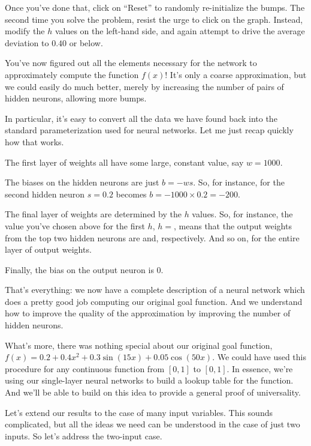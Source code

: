 Once you've done that, click on ``Reset'' to randomly re-initialize the bumps. The second time you solve the problem, resist the urge to click on the graph. Instead, modify the $h$ values on the left-hand side, and again attempt to drive the average deviation to $0.40$ or below.


You've now figured out all the elements necessary for the network to approximately compute the function $f(x)$! It's only a coarse approximation, but we could easily do much better, merely by increasing the number of pairs of hidden neurons, allowing more bumps.


In particular, it's easy to convert all the data we have found back into the standard parameterization used for neural networks. Let me just recap quickly how that works.


The first layer of weights all have some large, constant value, say $w = 1000$.


The biases on the hidden neurons are just $b = -w s$. So, for instance, for the second hidden neuron $s = 0.2$ becomes $b = -1000 \times 0.2 = -200$.


The final layer of weights are determined by the $h$ values. So, for instance, the value you've chosen above for the first $h$, $h = $, means that the output weights from the top two hidden neurons are and, respectively. And so on, for the entire layer of output weights.


Finally, the bias on the output neuron is $0$.


That's everything: we now have a complete description of a neural network which does a pretty good job computing our original goal function. And we understand how to improve the quality of the approximation by improving the number of hidden neurons.


What's more, there was nothing special about our original goal function, $f(x) = 0.2+0.4 x^2+0.3 \sin(15 x) + 0.05 \cos(50 x)$. We could have used this procedure for any continuous function from $[0, 1]$ to $[0, 1]$. In essence, we're using our single-layer neural networks to build a lookup table for the function. And we'll be able to build on this idea to provide a general proof of universality.





Let's extend our results to the case of many input variables. This sounds complicated, but all the ideas we need can be understood in the case of just two inputs. So let's address the two-input case.


